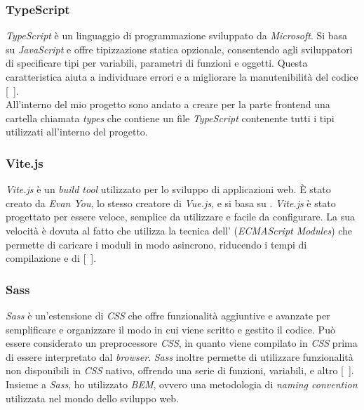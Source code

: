 \subsubsection{TypeScript}\label{subsubsec:TypeScript}
\textit{TypeScript} è un linguaggio di programmazione  sviluppato da \textit{Microsoft}. Si basa su \textit{JavaScript} e offre tipizzazione statica opzionale, 
consentendo agli sviluppatori di specificare tipi per variabili, parametri di funzioni e oggetti. Questa caratteristica aiuta a individuare errori e a migliorare 
la manutenibilità del codice [~\cite{site:typescript}].\\
All'interno del mio progetto sono andato a creare per la parte frontend una cartella chiamata \textit{types} che contiene un file \textit{TypeScript} contenente tutti i tipi utilizzati all'interno del progetto.
\subsubsection{Vite.js}\label{subsubsec:vite}
\textit{Vite.js} è un \textit{build tool} utilizzato per lo sviluppo di applicazioni web. È stato creato da \textit{Evan You}, lo stesso creatore di \textit{Vue.js}, e si basa su .
\textit{Vite.js} è stato progettato per essere veloce, semplice da utilizzare e facile da configurare. La sua velocità è dovuta al fatto che utilizza la tecnica dell' (\textit{ECMAScript Modules})
che permette di caricare i moduli in modo asincrono, riducendo i tempi di compilazione e di  [~\cite{site:vite}].
\subsubsection{Sass}\label{subsubsec:Sass}
\textit{Sass} è un'estensione di \textit{CSS} che offre funzionalità aggiuntive e avanzate per semplificare e organizzare il modo in cui viene scritto e gestito il codice.
Può essere considerato un preprocessore \textit{CSS}, in quanto viene compilato in \textit{CSS} prima di essere interpretato dal \textit{browser}. \textit{Sass} inoltre permette di utilizzare funzionalità non disponibili in \textit{CSS} nativo, offrendo una serie di funzioni, variabili,  e altro [~\cite{site:sass}].\\
Insieme a \textit{Sass}, ho utilizzato \textit{BEM}, ovvero una metodologia di \textit{naming convention} utilizzata nel mondo dello sviluppo web.


